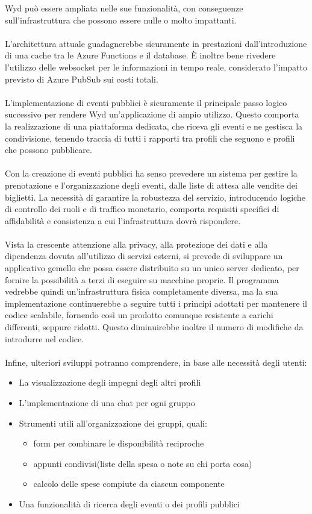 Wyd può essere ampliata nelle sue funzionalità,
con conseguenze sull'infrastruttura che possono essere nulle o molto impattanti.\\
\\
L'architettura attuale guadagnerebbe sicuramente in prestazioni dall'introduzione
di una cache tra le Azure Functions e il database.
È inoltre bene rivedere l'utilizzo delle websocket per le informazioni in tempo reale, 
considerato l'impatto previsto di Azure PubSub sui costi totali.\\
\\
L'implementazione di eventi pubblici è sicuramente il principale passo logico successivo 
per rendere Wyd un'applicazione di ampio utilizzo.
Questo comporta la realizzazione di una piattaforma dedicata,
che riceva gli eventi e ne gestisca la condivisione,
tenendo traccia di tutti i rapporti tra profili che seguono e 
profili che possono pubblicare.\\
\\
Con la creazione di eventi pubblici ha senso prevedere un sistema 
per gestire la prenotazione e l'organizzazione degli eventi,
dalle liste di attesa alle vendite dei biglietti.
La necessità di garantire la robustezza del servizio,
introducendo logiche di controllo dei ruoli e di traffico monetario,
comporta requisiti specifici di affidabilità e consistenza 
a cui l'infrastruttura dovrà rispondere.\\
\\
Vista la crescente attenzione alla privacy, 
alla protezione dei dati e alla dipendenza dovuta all'utilizzo di servizi esterni,
si prevede di sviluppare un applicativo gemello 
che possa essere distribuito su un unico server dedicato,
per fornire la possibilità a terzi di eseguire su macchine proprie.
Il programma vedrebbe quindi un'infrastruttura fisica completamente diversa,
ma la sua implementazione continuerebbe a seguire
tutti i principi adottati per mantenere il codice scalabile,
fornendo così un prodotto comunque resistente a carichi differenti, seppure ridotti.
Questo diminuirebbe inoltre il numero di modifiche da introdurre nel codice.\\
\\
Infine, ulteriori sviluppi potranno comprendere, in base alle necessità degli utenti:
\begin{itemize}
    \item La visualizzazione degli impegni degli altri profili
    \item L'implementazione di una chat per ogni gruppo
    \item Strumenti utili all'organizzazione dei gruppi, quali:
          \begin{itemize}
              \item form per combinare le disponibilità reciproche
              \item appunti condivisi(liste della spesa o note su chi porta cosa)
              \item calcolo delle spese compiute da ciascun componente
          \end{itemize}
    \item Una funzionalità di ricerca degli eventi o dei profili pubblici
\end{itemize}
\clearpage

